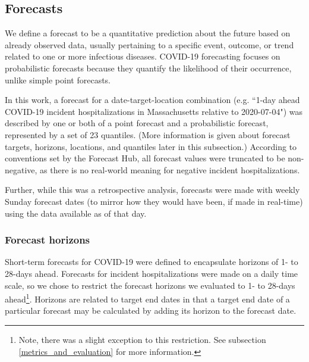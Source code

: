 \documentclass[12pt]{article}
\begin{document}
\subsection{Forecasts} \label{forecasts}
We define a forecast to be a quantitative prediction about the future based on already observed data, usually pertaining to a specific event, outcome, or trend related to one or more infectious diseases\cite{lauer}. COVID-19 forecasting focuses on probabilistic forecasts because they quantify the likelihood of their occurrence, unlike simple point forecasts\cite{cramer, hub_data_repo, lauer}.

In this work, a forecast for a date-target-location combination (e.g. ``1-day ahead COVID-19 incident hospitalizations in Massachusetts relative to 2020-07-04") was described by one or both of a point forecast and a probabilistic forecast, represented by a set of 23 quantiles\cite{cramer}. (More information is given about forecast targets, horizons, locations, and quantiles later in this subsection.) According to conventions set by the Forecast Hub, all forecast values were truncated to be non-negative, as there is no real-world meaning for negative incident hospitalizations\cite{ensembles_info}.

Further, while this was a retrospective analysis, forecasts were made with weekly Sunday forecast dates (to mirror how they would have been, if made in real-time) using the data available as of that day.

\subsubsection{Forecast horizons} \label{forecast_horizons}
Short-term forecasts for COVID-19 were defined to encapsulate horizons of 1- to 28-days ahead\cite{cramer}. Forecasts for incident hospitalizations were made on a daily time scale, so we chose to restrict the forecast horizons we evaluated to 1- to 28-days ahead\footnote{Note, there was a slight exception to this restriction. See subsection \ref{metrics_and_evaluation} for more information.}. Horizons are related to target end dates in that a target end date of a particular forecast may be calculated by adding its horizon to the forecast date.
\end{document}

